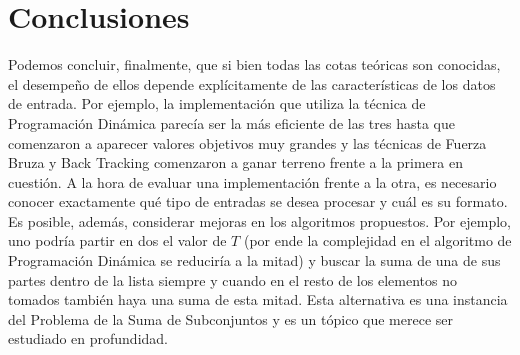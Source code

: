\section{Conclusiones}
Podemos concluir, finalmente, que si bien todas las cotas teóricas son conocidas, el desempeño de ellos depende explícitamente de las características de los datos de entrada. Por ejemplo, la implementación que utiliza la técnica de Programación Dinámica parecía ser la más eficiente de las tres hasta que comenzaron a aparecer valores objetivos muy grandes y las técnicas de Fuerza Bruza y Back Tracking comenzaron a ganar terreno frente a la primera en cuestión. A la hora de evaluar una implementación frente a la otra, es necesario conocer exactamente qué tipo de entradas se desea procesar y cuál es su formato. Es posible, además, considerar mejoras en los algoritmos propuestos. Por ejemplo, uno podría partir en dos el valor de $T$ (por ende la complejidad en el algoritmo de Programación Dinámica se reduciría a la mitad) y buscar la suma de una de sus partes dentro de la lista siempre y cuando en el resto de los elementos no tomados también haya una suma de esta mitad. Esta alternativa es una instancia del Problema de la Suma de Subconjuntos y es un tópico que merece ser estudiado en profundidad.